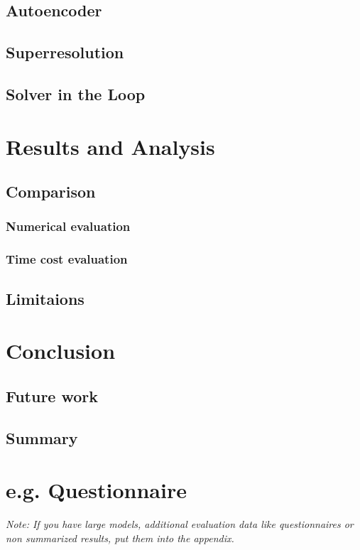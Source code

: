 \documentclass[a4paper,12pt,twoside]{report}
\begin{document}
\section{Autoencoder}

\section{Superresolution}

\section{Solver in the Loop}




\chapter{Results and Analysis}

\section{Comparison}

\subsection{Numerical evaluation}

\subsection{Time cost evaluation}

\section{Limitaions}






\chapter{Conclusion}
\section{Future work}
\section{Summary}






\appendix

\chapter{e.g. Questionnaire}

\textit{Note: If you have large models, additional evaluation data like questionnaires or non summarized results, put them into the appendix.}


\clearpage

\listoffigures
\clearpage

\listoftables
\clearpage



\end{document}
